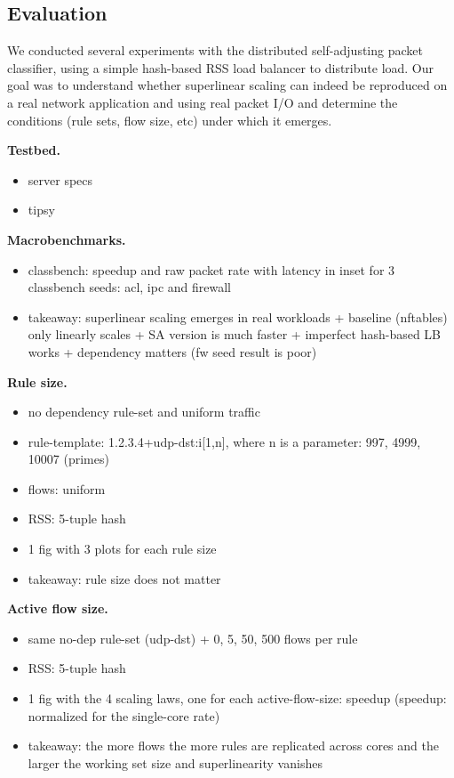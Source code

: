 \subsection{Evaluation}
\label{sec:sa-nf-tables-eval}

We conducted several experiments with the distributed self-adjusting packet classifier, using a simple hash-based RSS load balancer to distribute load. Our goal was to understand whether superlinear scaling can indeed be reproduced on a real network application and using real packet I/O and determine the conditions (rule sets, flow size, etc) under which it emerges.

\noindent
\textbf{Testbed.} %

\begin{itemize}
\item server specs
\item tipsy~\cite{8468219}
\end{itemize}

\noindent
\textbf{Macrobenchmarks.} %
\begin{itemize}
\item classbench: speedup and raw packet rate with latency in inset for 3 classbench seeds: acl, ipc and firewall
\item takeaway: superlinear scaling emerges in real workloads + baseline (nftables) only linearly scales + SA version is much faster + imperfect hash-based LB works + dependency matters (fw seed result is poor)
\end{itemize}

\noindent
\textbf{Rule size.} %
\begin{itemize}
\item no dependency rule-set and uniform traffic
\item rule-template: 1.2.3.4+udp-dst:i[1,n], where n is a parameter: 997, 4999, 10007 (primes)
\item flows: uniform 
\item RSS: 5-tuple hash
\item 1 fig with 3 plots for each rule size
\item takeaway: rule size does not matter
\end{itemize}

\noindent
\textbf{Active flow size.} %
\begin{itemize}
\item same no-dep rule-set (udp-dst) + 0, 5, 50, 500 flows per rule
\item RSS: 5-tuple hash
\item 1 fig with the 4 scaling laws, one for each active-flow-size: speedup (speedup: normalized for the single-core rate)
\item takeaway: the more flows the more rules are replicated across cores and the larger the working set size and superlinearity vanishes
\end{itemize}

